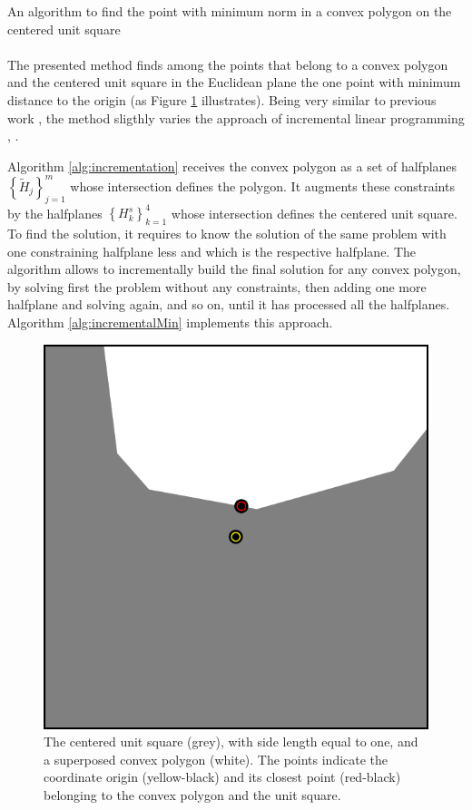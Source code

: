 \documentclass{article}
\begin{document}
{\centering \Large An algorithm to find the point with minimum norm in a convex polygon on the centered unit square\\}
~\\
The presented method finds among the points that belong to a convex polygon and the centered unit square in the Euclidean plane the one point with minimum distance to the origin (as Figure \ref{fig:minNorm} illustrates).
Being very similar to previous work \cite{van2011reciprocal}, the method sligthly varies the approach of incremental linear programming \cite{seidel1991small}, \cite{van2008computational}.

Algorithm \ref{alg:incrementation} receives the convex polygon as a set of halfplanes $ \left\{\tilde H_j\right\}_{j=1}^{m}$ whose intersection defines the polygon. It augments these constraints by the halfplanes $ \left\{H_k^s\right\}_{k=1}^{4}$ whose intersection defines the centered unit square.
To find the solution, it requires to know the solution of the same problem with one constraining halfplane less and which is the respective halfplane. The algorithm allows to incrementally build the final solution for any convex polygon, by solving first the problem without any constraints, then adding one more halfplane and solving again, and so on, until it has processed all the halfplanes. Algorithm \ref{alg:incrementalMin} implements this approach.
\begin{figure}[b!]
	\centering
	\includegraphics[scale=0.7]{../distance_minimization_unit_square.pdf}
	\caption{The centered unit square (grey), with side length equal to one, and a superposed convex polygon (white). The points indicate the coordinate origin (yellow-black) and its closest point (red-black) belonging to the convex polygon and the unit square.}\label{fig:minNorm}
\end{figure}
\end{document}
